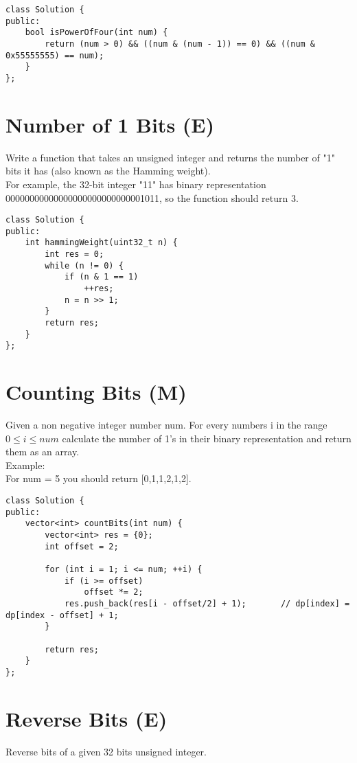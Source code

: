 \begin{lstlisting}
class Solution {
public:
    bool isPowerOfFour(int num) {
        return (num > 0) && ((num & (num - 1)) == 0) && ((num & 0x55555555) == num);
    }
};
\end{lstlisting}


\section{Number of 1 Bits (E)}
Write a function that takes an unsigned integer and returns the number of "1" bits it has (also known as the Hamming weight).\\

For example, the 32-bit integer "11" has binary representation 00000000000000000000000000001011, so the function should return 3.\\

\begin{lstlisting}
class Solution {
public:
    int hammingWeight(uint32_t n) {
        int res = 0;
        while (n != 0) {
            if (n & 1 == 1)
                ++res;
            n = n >> 1;
        }
        return res;
    }
};
\end{lstlisting}


\section{Counting Bits (M)}
Given a non negative integer number num. For every numbers i in the range $0 \leq i \leq num$ calculate the number of 1's in their binary representation and return them as an array.\\

Example:\\
For num = 5 you should return [0,1,1,2,1,2]. \\

\begin{lstlisting}
class Solution {
public:
    vector<int> countBits(int num) {
        vector<int> res = {0};
        int offset = 2;
        
        for (int i = 1; i <= num; ++i) {                
            if (i >= offset)
                offset *= 2;
            res.push_back(res[i - offset/2] + 1);       // dp[index] = dp[index - offset] + 1;
        }
        
        return res;
    }
};
\end{lstlisting}


\section{Reverse Bits (E)}
Reverse bits of a given 32 bits unsigned integer.\\

